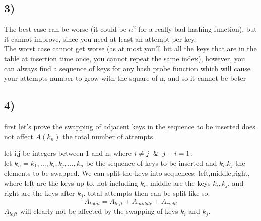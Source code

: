 \documentclass{report}
\begin{document}
\subsection*{3)}
The best case can be worse (it could be $n^{2}$ for a really bad hashing function), but it cannot improve, since you need at least an attempt per key.\\
The worst case cannot get worse (as at most you'll hit all the keys that are in the table at insertion time once, you cannot repeat the same index), however, you can always find a sequence of keys for any hash probe function which will cause your attempts number to grow with the square of n, and so it cannot be beter
\subsection*{4)}
first let's prove the swapping of adjacent keys in the sequence to be inserted does not affect $A(k_{n})$ the total number of attempts.\\\usepackage{xcolor}

let i,j be integers between 1 and n, where $i \neq j \And j - i = 1$.\\
let $k_{n} = k_{1},\hdots,k_{i},k_{j},\hdots,k_{n}$ be the sequence of keys to be inserted and $k_{i}$,$k_{j}$ the elements to be swapped.
We can split the keys into sequences: left,middle,right, where left are the keys up to, not including $k_{i}$, middle are the  keys $k_{i},k_{j}$, and right are the keys after $k_{j}$. total attempts then can be split like so:
\begin{equation*}
 A_{total} = A_{left} + A_{middle} + A_{right}
\end{equation*}%
$A_{left}$ will clearly not be affected by the swapping of keys $k_{i}$ and $k_{j}$.\\
\end{document}
